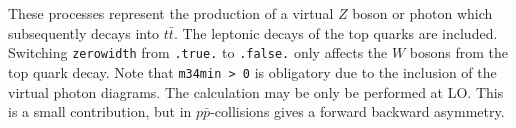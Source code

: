
These processes represent the production of a virtual $Z$ boson or photon
which subsequently decays into $t \bar{t}$.
The leptonic decays of the top quarks are included.
Switching {\tt zerowidth} from {\tt .true.} to {\tt .false.} only affects
the $W$ bosons from the top quark decay.
Note that {\tt m34min > 0} is obligatory due to the inclusion of the
virtual photon diagrams. The calculation may be only be performed at LO.
This is a small contribution, but in $p\bar{p}$-collisions gives a forward backward asymmetry.
